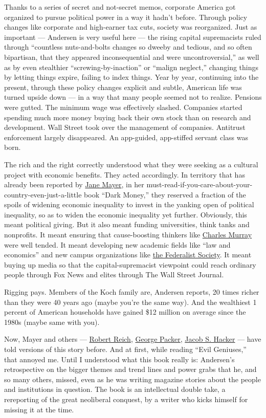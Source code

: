 Thanks to a series of secret and not-secret memos, corporate America got
organized to pursue political power in a way it hadn't before. Through
policy changes like corporate and high-earner tax cuts, society was
reorganized. Just as important --- Andersen is very useful here --- the
rising capital supremacists ruled through ``countless nuts-and-bolts
changes so dweeby and tedious, and so often bipartisan, that they
appeared inconsequential and were uncontroversial,'' as well as by even
stealthier ``screwing-by-inaction'' or ``malign neglect,'' changing
things by letting things expire, failing to index things. Year by year,
continuing into the present, through these policy changes explicit and
subtle, American life was turned upside down --- in a way that many
people seemed not to realize. Pensions were gutted. The minimum wage was
effectively slashed. Companies started spending much more money buying
back their own stock than on research and development. Wall Street took
over the management of companies. Antitrust enforcement largely
disappeared. An app-guided, app-stiffed servant class was born.

The rich and the right correctly understood what they were seeking as a
cultural project with economic benefits. They acted accordingly. In
territory that has already been reported by
\href{https://www.jane-mayer.com}{Jane Mayer}, in her
must-read-if-you-care-about-your-country-even-just-a-little book ``Dark
Money,'' they reserved a fraction of the spoils of widening economic
inequality to invest in the yanking open of political inequality, so as
to widen the economic inequality yet further. Obviously, this meant
political giving. But it also meant funding universities, think tanks
and nonprofits. It meant ensuring that cause-boosting thinkers like
\href{https://www.aei.org/profile/charles-murray/}{Charles Murray} were
well tended. It meant developing new academic fields like ``law and
economics'' and new campus organizations like
\href{https://fedsoc.org}{the Federalist Society}. It meant buying up
media so that the capital-supremacist viewpoint could reach ordinary
people through Fox News and elites through The Wall Street Journal.

Rigging pays. Members of the Koch family are, Andersen reports, 20 times
richer than they were 40 years ago (maybe you're the same way). And the
wealthiest 1 percent of American households have gained \$12 million on
average since the 1980s (maybe same with you).

Now, Mayer and others --- \href{https://robertreich.org}{Robert Reich},
\href{https://www.theatlantic.com/author/george-packer/}{George Packer},
\href{https://www.jacobhacker.com}{Jacob S. Hacker} --- have told
versions of this story before. And at first, while reading ``Evil
Geniuses,'' that annoyed me. Until I understood what this book really
is: Andersen's retrospective on the bigger themes and trend lines and
power grabs that he, and so many others, missed, even as he was writing
magazine stories about the people and institutions in question. The book
is an intellectual double take, a rereporting of the great neoliberal
conquest, by a writer who kicks himself for missing it at the time.

